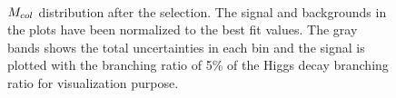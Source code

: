 \begin{figure}[htbp] 
     \centering
     \\
     \caption{$M_{col}$ distribution after the selection. The signal and backgrounds in the plots have been normalized to the best fit values. The gray bands shows the total uncertainties in each bin and the signal is plotted with the branching ratio of 5\% of the Higgs decay branching ratio for visualization purpose.}
     \label{fig:cutbasedpostfit}
\end{figure}



